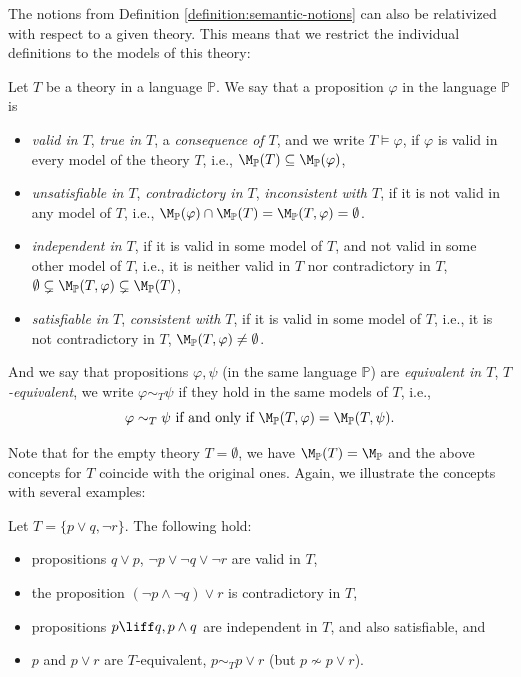 The notions from Definition \ref{definition:semantic-notions} can also be relativized with respect to a given theory. This means that we restrict the individual definitions to the models of this theory:

\begin{definition}
    Let $T$ be a theory in a language $\mathbb P$. We say that a proposition $\varphi$ in the language $\mathbb P$ is
    \begin{itemize}
        \item \emph{valid in $T$}, \emph{true in $T$}, a \emph{consequence of $T$}, and we write $T \models \varphi$, if $\varphi$ is valid in every model of the theory $T$, i.e., $\M_\mathbb P(T) \subseteq \M_\mathbb P(\varphi)$,
        \item \emph{unsatisfiable in $T$}, \emph{contradictory in $T$}, \emph{inconsistent with $T$}, if it is not valid in any model of $T$, i.e., $\M_\mathbb P(\varphi) \cap \M_\mathbb P(T) = \M_\mathbb P(T,\varphi) = \emptyset$.
        \item \emph{independent in $T$}, if it is valid in some model of $T$, and not valid in some other model of $T$, i.e., it is neither valid in $T$ nor contradictory in $T$, $\emptyset \subsetneq \M_\mathbb P(T,\varphi) \subsetneq \M_\mathbb P(T)$,
        \item \emph{satisfiable in $T$}, \emph{consistent with $T$}, if it is valid in some model of $T$, i.e., it is not contradictory in $T$, $\M_\mathbb P(T,\varphi) \neq \emptyset$.
    \end{itemize}
    And we say that propositions $\varphi, \psi$ (in the same language $\mathbb P$) are \emph{equivalent in $T$}, \emph{$T$-equivalent}, we write $\varphi \sim_T \psi$ if they hold in the same models of $T$, i.e.,
    $$
    \varphi \sim_T \psi \text{ if and only if } \M_\mathbb P(T,\varphi) = \M_\mathbb P(T,\psi).
    $$
\end{definition}

Note that for the empty theory $T = \emptyset$, we have $\M_\mathbb P(T) = \M_\mathbb P$ and the above concepts for $T$ coincide with the original ones. Again, we illustrate the concepts with several examples:

\begin{example} Let $T = \{p \lor q, \neg r\}$. The following hold:
    \begin{itemize}
        \item propositions $q \lor p$, $\neg p \lor \neg q \lor \neg r$ are valid in $T$,
        \item the proposition $(\neg p \land \neg q) \lor r$ is contradictory in $T$,
        \item propositions $p \liff q, p \land q$ are independent in $T$, and also satisfiable, and
        \item $p$ and $p\lor r$ are $T$-equivalent, $p \sim_T p \lor r$ (but $p \not\sim p \lor r$).
    \end{itemize}      
\end{example}


